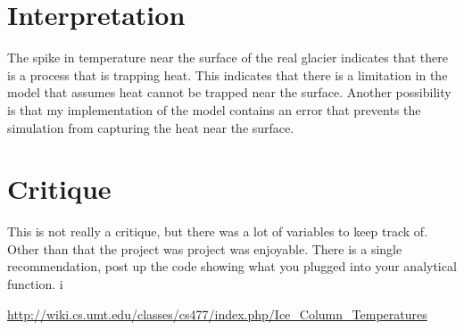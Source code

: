\documentclass{article}%
\begin{document}
    \section{Interpretation}
    The spike in temperature near the surface of the real glacier indicates that there is a process 
    that is trapping heat. This indicates that there is a limitation in the model that assumes heat cannot be trapped near the surface. Another possibility is that my implementation of the model contains an error that prevents the simulation from capturing the heat near the surface. 

    \section{Critique} 
    This is not really a critique, but there was a lot of variables to keep track of. Other than that the project was project was enjoyable. There is a single recommendation, post up the code showing what you plugged into your analytical function. i

    \begin{thebibliography}{1}
        \url{http://wiki.cs.umt.edu/classes/cs477/index.php/Ice\_Column\_Temperatures}
    \end{thebibliography} 
\end{document}
